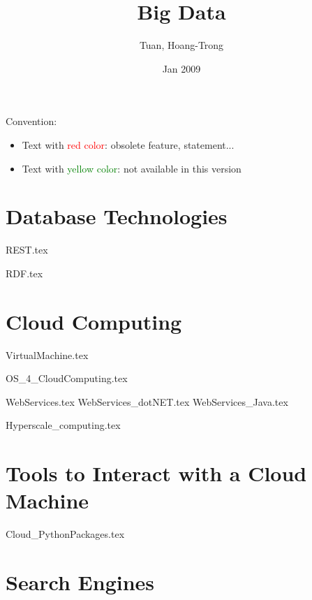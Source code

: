 \documentclass[11pt]{book}
\begin{document}
\author{Tuan, Hoang-Trong}
\title{Big Data}
\date{Jan 2009}

\frontmatter
\tableofcontents
%

\mainmatter
{}

Convention:

\begin{itemize}
\item Text with \textcolor{red}{red color}: obsolete feature,
  statement...
\item Text with \textcolor{green}{yellow color}: not available in this
  version
\end{itemize}

\part{Database Technologies}

{REST.tex}

{RDF.tex}

 

\part{Cloud Computing}
{VirtualMachine.tex}
 
{OS_4_CloudComputing.tex}

{WebServices.tex}
{WebServices_dotNET.tex}
{WebServices_Java.tex}



{Hyperscale_computing.tex}

\part{Tools to Interact with a Cloud Machine}
{Cloud_PythonPackages.tex}

\part{Search Engines}




 
\end{document}
